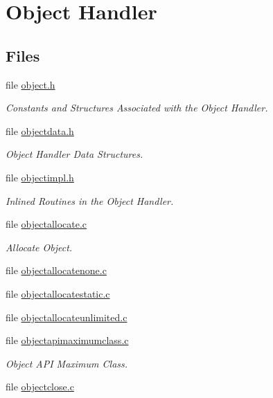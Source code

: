 \hypertarget{group__RTEMSScoreObject}{}\section{Object Handler}
\label{group__RTEMSScoreObject}
\subsection*{Files}
\begin{DoxyCompactItemize}
\item 
file \mbox{\hyperlink{score_2object_8h}{object.\+h}}
\begin{DoxyCompactList}\small\item\em Constants and Structures Associated with the Object Handler. \end{DoxyCompactList}\item 
file \mbox{\hyperlink{objectdata_8h}{objectdata.\+h}}
\begin{DoxyCompactList}\small\item\em Object Handler Data Structures. \end{DoxyCompactList}\item 
file \mbox{\hyperlink{objectimpl_8h}{objectimpl.\+h}}
\begin{DoxyCompactList}\small\item\em Inlined Routines in the Object Handler. \end{DoxyCompactList}\item 
file \mbox{\hyperlink{objectallocate_8c}{objectallocate.\+c}}
\begin{DoxyCompactList}\small\item\em Allocate Object. \end{DoxyCompactList}\item 
file \mbox{\hyperlink{objectallocatenone_8c}{objectallocatenone.\+c}}
\item 
file \mbox{\hyperlink{objectallocatestatic_8c}{objectallocatestatic.\+c}}
\item 
file \mbox{\hyperlink{objectallocateunlimited_8c}{objectallocateunlimited.\+c}}
\item 
file \mbox{\hyperlink{objectapimaximumclass_8c}{objectapimaximumclass.\+c}}
\begin{DoxyCompactList}\small\item\em Object A\+PI Maximum Class. \end{DoxyCompactList}\item 
file \mbox{\hyperlink{objectclose_8c}{objectclose.\+c}}

\end{DoxyCompactItemize}

